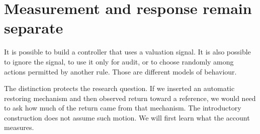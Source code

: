 \section{Measurement and response remain separate}
It is possible to build a controller that uses a valuation signal. It is also possible to ignore the signal, to use it only for audit, or to choose randomly among actions permitted by another rule. Those are different models of behaviour.

The distinction protects the research question. If we inserted an automatic restoring mechanism and then observed return toward a reference, we would need to ask how much of the return came from that mechanism. The introductory construction does not assume such motion. We will first learn what the account measures.


